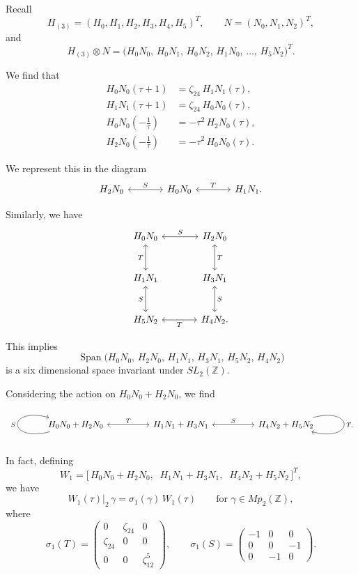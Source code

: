 \documentclass[11pt,reqno]{amsart}
\renewcommand{\=}{\;=\;}
\theoremstyle{myremark}
\begin{document}
Recall
\[
H_{(3)} = (H_0, H_1, H_2, H_3, H_4, H_5)^T,
\qquad
N = (N_0, N_1, N_2)^T,
\]
and
\[
H_{(3)} \otimes N
= \bigl(H_0 N_0,\, H_0 N_1,\, H_0 N_2,\, H_1 N_0,\, \ldots,\, H_5 N_2\bigr)^T.
\]

We find that
\begin{align*}
H_0 N_0 (\tau+1) &= \zeta_{24}\, H_1 N_1(\tau), \\
H_1 N_1 (\tau+1) &= \zeta_{24}\, H_0 N_0(\tau), \\
H_0 N_0\!\left(-\tfrac{1}{\tau}\right) &= -\tau^2\, H_2 N_0(\tau), \\
H_2 N_0\!\left(-\tfrac{1}{\tau}\right) &= -\tau^2\, H_0 N_0(\tau).
\end{align*}

We represent this in the diagram
\[
\begin{tikzcd}[column sep=large]
H_2 N_0 \arrow[r, leftrightarrow, "S"] & H_0 N_0 \arrow[r, leftrightarrow, "T"] & H_1 N_1.
\end{tikzcd}
\]

Similarly, we have
\[
\begin{tikzcd}[column sep=large, row sep=large]
H_0 N_0 \arrow[r, leftrightarrow, "S"] \arrow[d, leftrightarrow, "T"']
  & H_2 N_0 \arrow[d, leftrightarrow, "T"] \\
H_1 N_1 \arrow[d, leftrightarrow, "S"']
  & H_3 N_1 \arrow[d, leftrightarrow, "S"] \\
H_5 N_2 \arrow[r, leftrightarrow, "T"']
  & H_4 N_2.
\end{tikzcd}
\]

This implies
\[
\operatorname{Span}\bigl( H_0 N_0,\, H_2 N_0,\, H_1 N_1,\, H_3 N_1,\, H_5 N_2,\, H_4 N_2 \bigr)
\]
is a six dimensional space invariant under $SL_2(\mathbb{Z})$.

\bigskip

Considering the action on $H_0 N_0 + H_2 N_0$, we find
\[
\begin{tikzcd}[column sep=huge]
H_0 N_0 + H_2 N_0
  \arrow[r, leftrightarrow, "T"]
  \arrow[loop left, "S"]
& H_1 N_1 + H_3 N_1
  \arrow[r, leftrightarrow, "S"]
& H_4 N_2 + H_5 N_2
  \arrow[loop right, "T."]
\end{tikzcd}
\]

In fact, defining
\[
W_1 = \bigl[\, H_0 N_0 + H_2 N_0,\;\; H_1 N_1 + H_3 N_1,\;\; H_4 N_2 + H_5 N_2 \,\bigr]^T,
\]
we have
\[
W_1(\tau)\big|_{2}\, \gamma = \sigma_1(\gamma)\, W_1(\tau) \qquad \text{for } \gamma \in Mp_2(\mathbb{Z}),
\]
where
\[
\sigma_1(T) =
\begin{pmatrix}
0 & \zeta_{24} & 0 \\
\zeta_{24} & 0 & 0 \\
0 & 0 & \zeta_{12}^{5}
\end{pmatrix},
\qquad
\sigma_1(S) =
\begin{pmatrix}
-1 & 0 & 0 \\
0 & 0 & -1 \\
0 & -1 & 0
\end{pmatrix}.
\]
\end{document}
